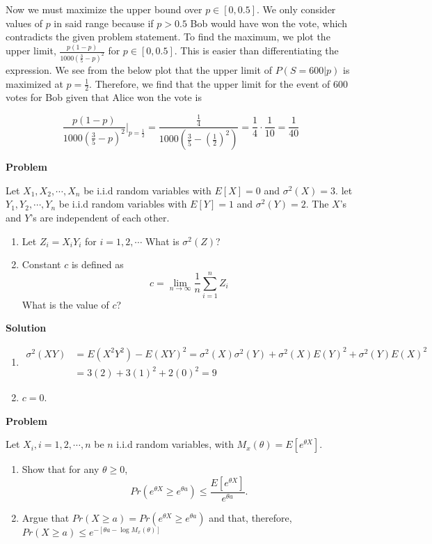 \documentclass[11pt]{article}
\newcounter{problem}
\newcounter{solution}
\newcommand\Problem{%
  \stepcounter{problem}%
  \textbf{Problem \theproblem}~%
  \setcounter{solution}{0}%
}
\newcommand\TheSolution{%
  \textbf{Solution}\:\:%
}
\begin{document}
  Now we must maximize the upper bound over $p \in [0, 0.5]$. We only consider
  values of $p$ in said range because if $p>0.5$ Bob would have won the vote,
  which contradicts the given problem statement. To find the maximum, we plot
  the upper limit, $\frac{p(1-p)}{1000(\frac{3}{5}-p)^2}$ for $p \in [0,
  0.5]$. This is easier than differentiating the expression. We see from the
  below plot that the upper limit of $P(S=600|p)$ is maximized at
  $p=\frac{1}{2}$. Therefore, we find that the upper limit for the event of 600
  votes for Bob given that Alice won the vote is

  \begin{equation}
    \frac{p(1-p)}{1000\left(\frac{3}{5}-p\right)^2}\vert_{p=\frac{1}{2}} = \frac{\frac{1}{4}}{1000\left(\frac{3}{5}-\left(\frac{1}{2}\right)^2\right)} = \frac{1}{4}\cdot\frac{1}{10} = \frac{1}{40}
  \end{equation}


  \Problem
  Let $X_1, X_2, \cdots, X_n$ be i.i.d random variables with $E[X]=0$ and
  $\sigma^2(X)=3$. let $Y_1, Y_2, \cdots, Y_n$ be i.i.d random variables with %
  $E[Y]=1$ and $\sigma^2(Y)=2$. The $X$'s and $Y$'s are independent of each other.

  \begin{enumerate}
  \item Let $Z_i = X_iY_i$ for $i=1,2,\cdots$ What is $\sigma^2(Z)$?
  \item Constant $c$ is defined as $$c=\lim_{n\to\infty}\frac{1}{n}\sum_{i=1}^nZ_i$$ What is the
    value of $c$?
  \end{enumerate}

  \TheSolution
  \begin{enumerate}
    \item
      \begin{align}
        \sigma^2(XY)&=E(X^2Y^2)-E(XY)^2=\sigma^2(X)\sigma^2(Y)+\sigma^2(X)E(Y)^2+\sigma^2(Y)E(X)^2 \\
        &= 3(2)+3(1)^2+2(0)^2 = 9
      \end{align}
  \item $c = 0$.
  \end{enumerate}

  \Problem
  Let $X_i, i=1,2,\cdots,n$ be $n$ i.i.d random variables, with
  $M_x(\theta)=E[e^{\theta{}X}]$.
  \begin{enumerate}
  \item Show that for any $\theta \geq 0$,
    \begin{equation*}
      Pr(e^{\theta{}X} \geq e^{\theta{}a}) \leq \frac{E[e^{\theta{}X}]}{e^{\theta{}a}}.
    \end{equation*}
  \item Argue that $Pr(X\geq{}a) = Pr(e^{\theta{}X} \geq e^{\theta{}a})$ and
    that, therefore, $Pr(X\geq a) \leq e^{-[\theta{}a-\log{M_x(\theta)}]}$
  \end{enumerate}
\end{document}
